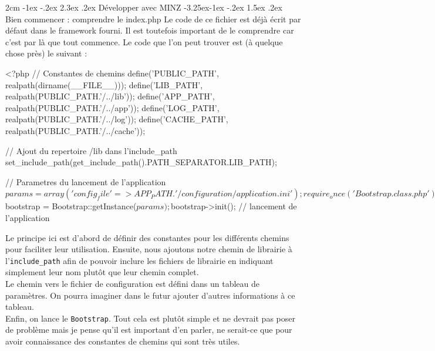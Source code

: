 \documentclass[a4paper,11pt]{article}
\makeatletter
\renewcommand\section{\@startsection{section}{1}{\z@}%
	{2cm \@plus -1ex \@minus -.2ex}%
	{2.3ex \@plus.2ex}%
	{\color{bleuClair}\reset@font\Large\bfseries}}
\renewcommand{\subsection}{\@startsection{subsection}{2}{\z@}%
             {-3.25ex\@plus -1ex \@minus -.2ex}%
             {1.5ex \@plus .2ex}%
             {\color{bleuFonce}\normalfont\large\bfseries}}
\makeatother
\begin{document}
\newpage

\section{Développer avec MINZ}
\subsection{Bien commencer : comprendre le index.php}
Le code de ce fichier est déjà écrit par défaut dans le framework fourni. Il est toutefois important de le comprendre car c'est par là que tout commence. Le code que l'on peut trouver est (à quelque chose près) le suivant :
\begin{PHP}
<?php
// Constantes de chemins
define('PUBLIC_PATH', realpath(dirname(__FILE__)));
define('LIB_PATH', realpath(PUBLIC_PATH.'/../lib'));
define('APP_PATH', realpath(PUBLIC_PATH.'/../app'));
define('LOG_PATH', realpath(PUBLIC_PATH.'/../log'));
define('CACHE_PATH', realpath(PUBLIC_PATH.'/../cache'));

// Ajout du repertoire /lib dans l'include_path
set_include_path(get_include_path().PATH_SEPARATOR.LIB_PATH);

// Parametres du lancement de l'application
$params = array(
'config_file' => APP_PATH.'/configuration/application.ini'
);

require_once('Bootstrap.class.php');

$bootstrap = Bootstrap::getInstance($params);
$bootstrap->init(); // lancement de l'application
\end{PHP}

Le principe ici est d'abord de définir des constantes pour les différents chemins pour faciliter leur utilisation. Ensuite, nous ajoutons notre chemin de librairie à l'\texttt{include\_path} afin de pouvoir inclure les fichiers de librairie en indiquant simplement leur nom plutôt que leur chemin complet.\\

Le chemin vers le fichier de configuration est défini dans un tableau de paramètres. On pourra imaginer dans le futur ajouter d'autres informations à ce tableau.\\

Enfin, on lance le \texttt{Bootstrap}. Tout cela est plutôt simple et ne devrait pas poser de problème mais je pense qu'il est important d'en parler, ne serait-ce que pour avoir connaissance des constantes de chemins qui sont très utiles.
\end{document}
